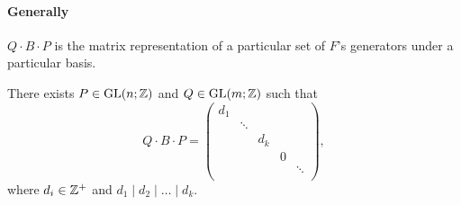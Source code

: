 \paragraph{Generally} \(Q\cdot B\cdot P\) is the matrix representation of a particular set of \(F\)'s generators under a particular basis.

\begin{proposition}\label{prop:appendix-1}
	There exists \(P\in \mathrm{GL}(n; \mathbb{\MakeUppercase{z}} ) \) and \(Q\in \mathrm{GL}(m; \mathbb{\MakeUppercase{z}} ) \) such that
	\[
		Q\cdot B\cdot P = \begin{pmatrix}
			d_1 &        &       &   &        \\
			    & \ddots &       &   &        \\
			    &        & d_{k} &   &        \\
			    &        &       & 0 &        \\
			    &        &       &   & \ddots \\
		\end{pmatrix},
	\]
	where \(d_{i} \in \mathbb{\MakeUppercase{z}} ^+\) and \(d_1 \mid d_2 \mid \ldots \mid d_{k}  \).
\end{proposition}
